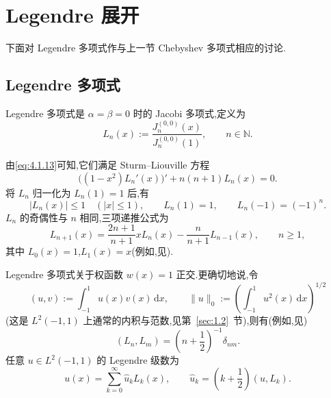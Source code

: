 \section{Legendre 展开}\label{sec:4.4}

下面对 Legendre 多项式作与上一节 Chebyshev 多项式相应的讨论.

\subsection{Legendre 多项式}\label{sec:4.4.1}

\begin{definition*}
Legendre 多项式是 \(\alpha=\beta=0\) 时的 Jacobi 多项式,定义为
\begin{equation}\label{eq:4.4.1}
  L_n(x):=\frac{J_n^{(0,0)}(x)}{J_n^{(0,0)}(1)},\qquad n\in\mathbb N.
\end{equation}
\end{definition*}
由\eqref{eq:4.1.13}可知,它们满足 Sturm--Liouville 方程
\begin{equation}\label{eq:4.4.2}
  \bigl((1-x^2)L_n'(x)\bigr)'+n(n+1)L_n(x)=0.
\end{equation}
将 \(L_n\) 归一化为 \(L_n(1)=1\) 后,有
\begin{equation}\label{eq:4.4.3}
  |L_n(x)|\le1\quad (|x|\le1),\qquad L_n(1)=1,\qquad L_n(-1)=(-1)^n.
\end{equation}
\(L_n\) 的奇偶性与 \(n\) 相同,三项递推公式为
\begin{equation}\label{eq:4.4.4}
  L_{n+1}(x)=\frac{2n+1}{n+1}xL_n(x)-\frac n{n+1}L_{n-1}(x),\qquad n\ge1,
\end{equation}
其中 \(L_0(x)=1\),\(L_1(x)=x\)(例如,见).

Legendre 多项式关于权函数 \(w(x)=1\) 正交.更确切地说,令
\begin{equation}\label{eq:4.4.5}
  (u,v):=\int_{-1}^1u(x)v(x)\,\mathrm dx,\qquad
  \|u\|_0:=\left(\int_{-1}^1u^2(x)\,\mathrm dx\right)^{1/2}
\end{equation}
(这是 \(L^2(-1,1)\) 上通常的内积与范数,见第~\ref{sec:1.2}~节),则有(例如,见)
\begin{equation}\label{eq:4.4.6}
  (L_n,L_m)=\left(n+\frac12\right)^{-1}\delta_{nm}.
\end{equation}
任意 \(u\in L^2(-1,1)\) 的 Legendre 级数为
\begin{equation}\label{eq:4.4.7}
  u(x)=\sum_{k=0}^\infty\widehat u_kL_k(x),\qquad
  \widehat u_k=\left(k+\frac12\right)(u,L_k).
\end{equation}

